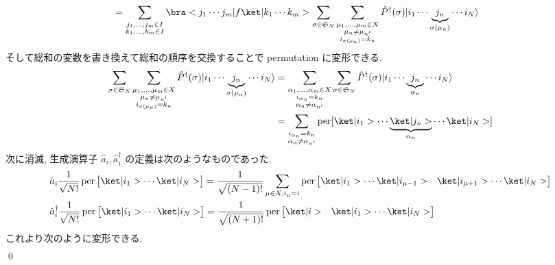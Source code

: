 \documentclass[uplatex,dvipdfmx,a4paper,11pt]{jlreq}
\makeatletter
\DeclareMathOperator{\per}{per}
\renewcommand{\SS}{\mathfrak{S}}
\numberwithin{equation}{section}
\theoremstyle{definition}
\renewenvironment{proof}[1][\proofname]{\par
  \normalfont
  \topsep6\p@\@plus6\p@ \trivlist
  \item[\hskip\labelsep{\bfseries #1}\@addpunct{\bfseries}]\ignorespaces\quad\par
}{%
  \qed\endtrivlist\@endpefalse
}
\renewcommand\proofname{証明}
\makeatother
\begin{document}
\begin{proof}
\begin{align}
     & = \sum_{\substack{j_1,\ldots,j_m\in I                                                    \\ k_1,\ldots,k_m\in I}}\bra<j_1\cdots j_m|f\ket|k_1\cdots k_m>\sum_{\sigma\in\SS_N}\sum_{\substack{\mu_1,\ldots,\mu_m\in X     \\ \mu_n\neq\mu_{n'} \\ i_{\sigma(\mu_n)} = k_n}}\hat{P}^\dagger(\sigma)|i_1\cdots\underbrace{j_n}_{\sigma(\mu_n)}\cdots i_N\rangle
  \end{align}
  そして総和の変数を書き換えて総和の順序を交換することで permutation に変形できる.
  \begin{align}
    \sum_{\sigma\in\SS_N}\sum_{\substack{\mu_1,\ldots,\mu_m\in X \\ \mu_n\neq\mu_{n'} \\ i_{\sigma(\mu_n)} = k_n}}\hat{P}^\dagger(\sigma)|i_1\cdots\underbrace{j_n}_{\sigma(\mu_n)}\cdots i_N\rangle & = \sum_{\substack{\alpha_1,\ldots,\alpha_m\in X \\ i_{\alpha_n} = k_n \\ \alpha_n\neq\alpha_{n'}}}\sum_{\sigma\in\SS_N}\hat{P}^\dagger(\sigma)|i_1\cdots\underbrace{j_n}_{\alpha_n}\cdots i_N\rangle \\
     & = \sum_{\substack{i_{\alpha_n} = k_n                      \\ \alpha_n\neq\alpha_{n'}}}\per[\ket|i_1>\cdots\underbrace{\ket|j_n>}_{\alpha_n}\cdots\ket|i_N>]
  \end{align}
  次に消滅, 生成演算子 $\hat{a}_i, \hat{a}_i^\dagger$ の定義は次のようなものであった.
  \begin{align}
     & \hat{a}_i\frac{1}{\sqrt{N!}}\per\begin{bmatrix}\ket|i_1> \cdots \ket|i_N>\end{bmatrix} = \frac{1}{\sqrt{(N-1)!}}\sum_{\mu\in X, i_\mu = i}\per\begin{bmatrix}\ket|i_1> \cdots \ket|i_{\mu - 1}> & \ket|i_{\mu + 1}> \cdots \ket|i_N>\end{bmatrix} \\
     & \hat{a}_i^\dagger\frac{1}{\sqrt{N!}}\per\begin{bmatrix}\ket|i_1> \cdots \ket|i_N>\end{bmatrix} = \frac{1}{\sqrt{(N+1)!}}\per\begin{bmatrix}\ket|i> & \ket|i_1> \cdots \ket|i_N>\end{bmatrix}
  \end{align}
  これより次のように変形できる.
  \begin{align}

\end{align}
\end{proof}
\end{document}
